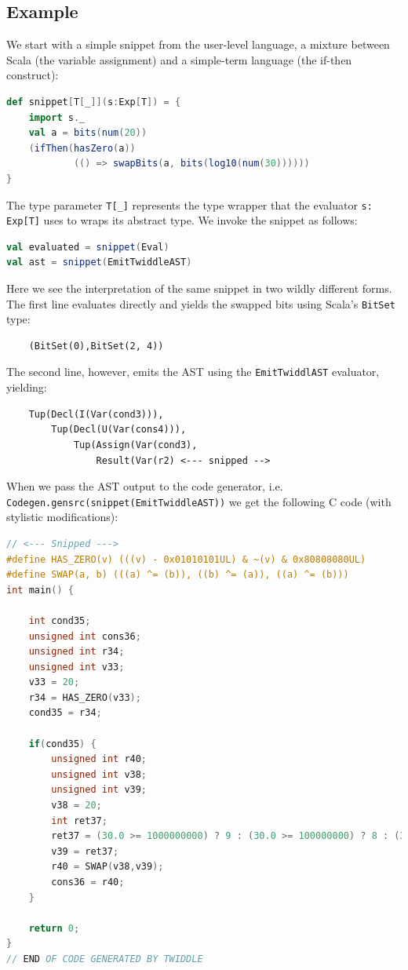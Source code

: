 \documentclass{article}
\begin{document}
\subsection{Example}
We start with a simple snippet from the user-level language, a mixture between Scala (the variable assignment) and a simple-term language (the if-then construct):
\begin{lstlisting}[language=Scala]
def snippet[T[_]](s:Exp[T]) = {
    import s._
    val a = bits(num(20))
    (ifThen(hasZero(a))
            (() => swapBits(a, bits(log10(num(30))))))
}
\end{lstlisting}
The type parameter \texttt{T[\_]} represents the type wrapper that the evaluator \texttt{s: Exp[T]} uses to wraps its abstract type. We invoke the snippet as follows:
\begin{lstlisting}[language=Scala]
val evaluated = snippet(Eval)
val ast = snippet(EmitTwiddleAST)
\end{lstlisting}
Here we see the interpretation of the same snippet in two wildly different forms. The first line evaluates directly and yields the swapped bits using Scala's \texttt{BitSet} type:
\begin{verbatim}
    (BitSet(0),BitSet(2, 4))
\end{verbatim}
The second line, however, emits the AST using the \texttt{EmitTwiddlAST} evaluator, yielding:
\begin{verbatim}
    Tup(Decl(I(Var(cond3))),
        Tup(Decl(U(Var(cons4))),
            Tup(Assign(Var(cond3),
                Result(Var(r2) <--- snipped -->
\end{verbatim}

When we pass the AST output to the code generator, i.e. \texttt{Codegen.gensrc(snippet(EmitTwiddleAST))} we get the following C code (with stylistic modifications):

\begin{lstlisting}[language=C]
// <--- Snipped --->
#define HAS_ZERO(v) (((v) - 0x01010101UL) & ~(v) & 0x80808080UL)
#define SWAP(a, b) (((a) ^= (b)), ((b) ^= (a)), ((a) ^= (b)))
int main() {

	int cond35;
	unsigned int cons36;
	unsigned int r34;
	unsigned int v33;
	v33 = 20;
	r34 = HAS_ZERO(v33);
	cond35 = r34;

	if(cond35) {
		unsigned int r40;
		unsigned int v38;
		unsigned int v39;
		v38 = 20;
		int ret37;
		ret37 = (30.0 >= 1000000000) ? 9 : (30.0 >= 100000000) ? 8 : (30.0 >= 10000000) ? 7 : (30.0 >= 1000000) ? 6 : (30.0 >= 100000) ? 5 : (30.0 >= 10000) ? 4 : (30.0 >= 1000) ? 3 : (30.0 >= 100) ? 2 : (30.0 >= 10) ? 1 : 0;
		v39 = ret37;
		r40 = SWAP(v38,v39);
		cons36 = r40;
	}

	return 0;
}
// END OF CODE GENERATED BY TWIDDLE
\end{lstlisting}
\end{document}
